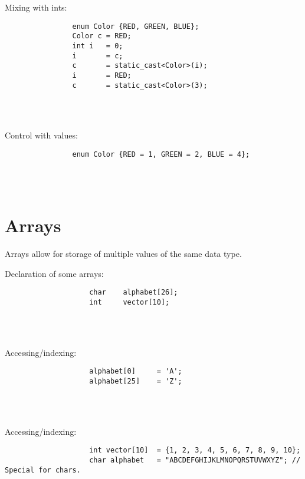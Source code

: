 \documentclass{report}
\begin{document}
			\begin{minipage}{\linewidth}
			Mixing with ints:
			\begin{lstlisting}
				enum Color {RED, GREEN, BLUE};
				Color c = RED;
				int i 	= 0;
				i 		= c;
				c 		= static_cast<Color>(i);
				i 		= RED;
				c 		= static_cast<Color>(3);
			\end{lstlisting}
			\end{minipage}
			\\ \\
			
			\begin{minipage}{\linewidth}
			Control with values:
			\begin{lstlisting}
				enum Color {RED = 1, GREEN = 2, BLUE = 4};
			\end{lstlisting}
			\end{minipage}
			\\ \\
		
		
		
		\section{Arrays}
			Arrays allow for storage of multiple values of the same data type. \\
			
			\begin{minipage}{\linewidth}
				Declaration of some arrays:
				\begin{lstlisting}
					char	alphabet[26];
					int 	vector[10];
				\end{lstlisting}
			\end{minipage}
			\\ \\
			
			\begin{minipage}{\linewidth}
				Accessing/indexing:
				\begin{lstlisting}
					alphabet[0] 	= 'A';
					alphabet[25]	= 'Z';
				\end{lstlisting}
			\end{minipage}
			\\ \\
			
			\begin{minipage}{\linewidth}
				Accessing/indexing:
				\begin{lstlisting}
					int vector[10] 	= {1, 2, 3, 4, 5, 6, 7, 8, 9, 10};
					char alphabet 	= "ABCDEFGHIJKLMNOPQRSTUVWXYZ";	// Special for chars.
				\end{lstlisting}
			\end{minipage}
			\\ \\
			
\end{document}
